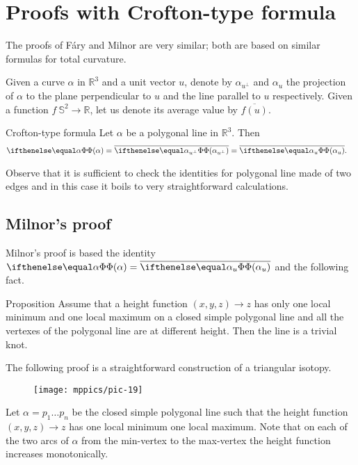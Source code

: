 \section{Proofs with Crofton-type formula}

The proofs of F\'ary and Milnor are very similar;
both are based on similar formulas for total curvature.

Given a curve $\alpha$ in $\mathbb{R}^3$ and a unit vector $u$, denote by $\alpha_{u^\perp}$ 
and $\alpha_u$ the projection of $\alpha$ to the plane perpendicular to $u$ and the line parallel to $u$ respectively.
Given a function $f\:\mathbb{S}^2\to\mathbb{R}$, let us denote its average value by $\overline{f(u)}$.

\begin{thm}{Crofton-type formula}\label{prop:tc-crofton}
Let $\alpha$ be a polygonal line in $\mathbb{R}^3$.
Then
\begin{align*}
\tc\alpha
&=\overline{\tc{\alpha_{u^\perp}}}
=\overline{\tc{\alpha_u}}.
\end{align*}
\end{thm}


Observe that it is sufficient to check the identities for polygonal line made of two edges
and in this case it boils to very straightforward calculations.
\qeds

\subsection*{Milnor's proof}

Milnor's proof is based the identity $\tc\alpha=\overline{\tc{\alpha_u}}$ and the following fact. 

\begin{thm}{Proposition}\label{prop:one-max-one-min}
Assume that a height function $(x,y,z)\to z$ 
has only one local minimum and one local maximum on a closed simple polygonal line and all the vertexes of the polygonal line are at different height.
Then the line is a trivial knot.
\end{thm}

The following proof is a straightforward construction of a triangular isotopy. 

\begin{wrapfigure}{r}{20 mm}
\vskip-0mm
\centering
\texttt{[image: mppics/pic-19]}
\vskip0mm
\end{wrapfigure}

Let $\alpha=p_1\dots p_n$ be the closed simple polygonal line
such that the height function $(x,y,z)\to z$ has one local minimum one local maximum.
Note that on each of the two arcs of $\alpha$ from the min-vertex to the max-vertex the height function increases monotonically.

